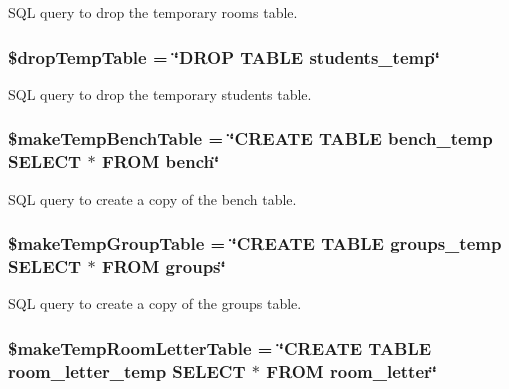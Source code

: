 \-S\-Q\-L query to drop the temporary rooms table. \hypertarget{manage_8php_ab1dd9f6f45ee74e34c0430f067a3c215}{
\subsubsection[{\$drop\-Temp\-Table}]{\setlength{\rightskip}{0pt plus 5cm}\$drop\-Temp\-Table = \char`\"{}\-D\-R\-O\-P \-T\-A\-B\-L\-E students\-\_\-temp\char`\"{}}}\label{manage_8php_ab1dd9f6f45ee74e34c0430f067a3c215}
\-S\-Q\-L query to drop the temporary students table. \hypertarget{manage_8php_ad31899f9608939d4b4d0166145cbf832}{
\subsubsection[{\$make\-Temp\-Bench\-Table}]{\setlength{\rightskip}{0pt plus 5cm}\$make\-Temp\-Bench\-Table = \char`\"{}\-C\-R\-E\-A\-T\-E \-T\-A\-B\-L\-E bench\-\_\-temp \-S\-E\-L\-E\-C\-T $\ast$ \-F\-R\-O\-M bench\char`\"{}}}\label{manage_8php_ad31899f9608939d4b4d0166145cbf832}
\-S\-Q\-L query to create a copy of the bench table. \hypertarget{manage_8php_ac943069bf7ec74f20a4d874e81a25d31}{
\subsubsection[{\$make\-Temp\-Group\-Table}]{\setlength{\rightskip}{0pt plus 5cm}\$make\-Temp\-Group\-Table = \char`\"{}\-C\-R\-E\-A\-T\-E \-T\-A\-B\-L\-E groups\-\_\-temp \-S\-E\-L\-E\-C\-T $\ast$ \-F\-R\-O\-M groups\char`\"{}}}\label{manage_8php_ac943069bf7ec74f20a4d874e81a25d31}
\-S\-Q\-L query to create a copy of the groups table. \hypertarget{manage_8php_a5764a84ed61064638292cd39c4270cad}{
\subsubsection[{\$make\-Temp\-Room\-Letter\-Table}]{\setlength{\rightskip}{0pt plus 5cm}\$make\-Temp\-Room\-Letter\-Table = \char`\"{}\-C\-R\-E\-A\-T\-E \-T\-A\-B\-L\-E room\-\_\-letter\-\_\-temp \-S\-E\-L\-E\-C\-T $\ast$ \-F\-R\-O\-M room\-\_\-letter\char`\"{}}}\label{manage_8php_a5764a84ed61064638292cd39c4270cad}

